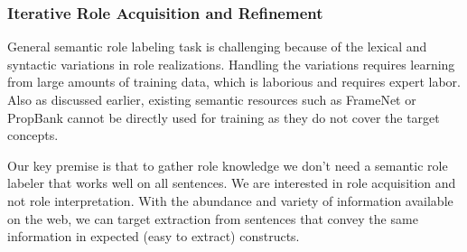 \subsubsection*{Iterative Role Acquisition and Refinement}
General semantic role labeling task is challenging because of the lexical and syntactic variations in role realizations. 
Handling the variations requires learning from large amounts of training data, which is laborious and requires expert labor.
Also as discussed earlier, existing semantic resources such as FrameNet or PropBank cannot be directly used for training as they do not cover the target concepts.

Our key premise is that to gather role knowledge we don't need a semantic role labeler that works well on all sentences. 
We are interested in role acquisition and not role interpretation.
With the abundance and variety of information available on the web, 
we can target extraction from sentences that convey the same information in expected (easy to extract) constructs.

